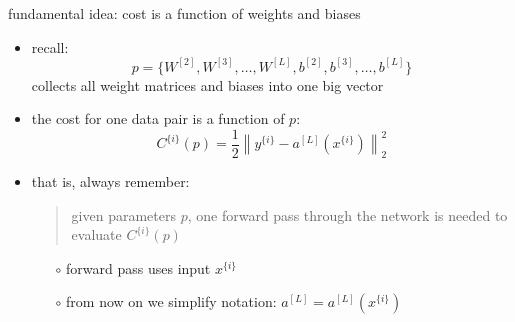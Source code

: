 \documentclass[xcolor={svgnames},
               hyperref={colorlinks,citecolor=DeepPink4,linkcolor=FireBrick,urlcolor=Maroon}]
               {beamer}
\begin{document}
\begin{frame}{fundamental idea: cost is a function of weights and biases}

\begin{itemize}
\item recall:
   $$p = \{W^{[2]},W^{[3]},\dots,W^{[L]},b^{[2]},b^{[3]},\dots,b^{[L]}\}$$
collects all weight matrices and biases into one big vector
\item \alert{the cost for one data pair is a function of} $p$:
    $$C^{\{i\}}(p) = \frac{1}{2} \left\|y^{\{i\}} - a^{[L]}(x^{\{i\}})\right\|_2^2$$
\item that is, always remember:

\bigskip
\begin{quote}
given parameters $p$, one forward pass through the network is needed to evaluate $C^{\{i\}}(p)$
\end{quote}

\medskip
    \begin{itemize}
    \item[$\circ$] forward pass uses input $x^{\{i\}}$
    \item[$\circ$] from now on we simplify notation: \quad $\displaystyle a^{[L]} = a^{[L]}(x^{\{i\}})$
    \end{itemize}
\end{itemize}
\end{frame}
\end{document}
